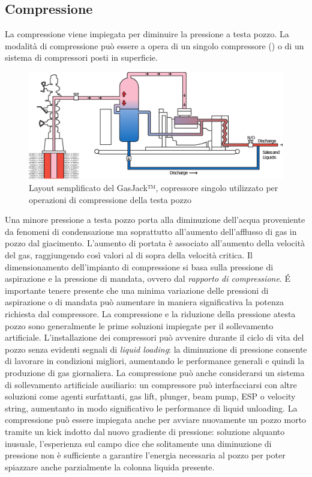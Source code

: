 \subsection{Compressione}
La compressione viene impiegata per diminuire la pressione a testa pozzo. La modalità di compressione può essere a opera di un singolo compressore () o di un sistema di compressori posti in superficie. 

\begin{figure}[htbp]
    \centering
    \includegraphics[width=\textwidth]{fig/foamer/compressore.eps}
    \caption{Layout semplificato del GasJack™, copressore singolo utilizzato per operazioni di compressione della testa pozzo \parencite{garner2009backside}}
    \label{fig:compressore}
\end{figure}

Una minore pressione a testa pozzo porta alla diminuzione dell'acqua proveniente da fenomeni di condensazione ma soprattutto all'aumento dell'afflusso di gas in pozzo dal giacimento. L'aumento di portata è associato all'aumento della velocità del gas, raggiungendo così valori al di sopra della velocità critica. Il dimensionamento dell'impianto di compressione si basa sulla pressione di aspirazione e la pressione di mandata, ovvero dal \textit{rapporto di compressione}. \'E importante tenere presente che una minima variazione delle pressioni di aspirazione o di mandata può aumentare in maniera significativa la potenza richiesta dal compressore. La compressione e la riduzione della pressione atesta pozzo sono generalmente le prime soluzioni impiegate per il sollevamento artificiale. L'installazione dei compressori può avvenire durante il ciclo di vita del pozzo senza evidenti segnali di \textit{liquid loading}: la diminuzione di pressione consente di lavorare in condizioni migliori, aumentando le performance generali e quindi la produzione di gas giornaliera. La compressione può anche considerarsi un sistema di sollevamento artificiale ausiliario: un compressore può interfacciarsi con altre soluzioni come agenti surfattanti, gas lift, plunger, beam pump, ESP o velocity string, aumentanto in modo significativo le performance di liquid unloading. La compressione può essere impiegata anche per avviare nuovamente un pozzo morto tramite un kick indotto dal nuovo gradiente di pressione: soluzione alquanto inusuale, l'esperienza sul campo dice che solitamente una diminuzione di pressione non è sufficiente a garantire l'energia necessaria al pozzo per poter spiazzare anche parzialmente la colonna liquida presente.

